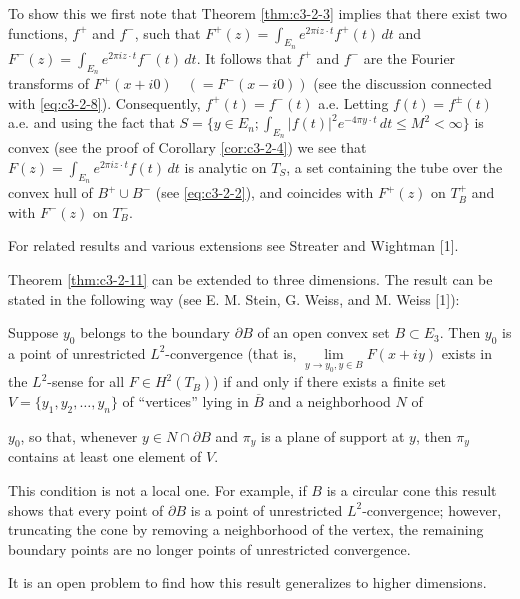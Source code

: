 To show this we first note that Theorem \ref{thm:c3-2-3} implies that there exist two functions, $f^+$ and $f^-$, such that $F^+(z) = \int_{E_n} e^{2\pi iz \cdot t} f^+(t) \, dt$ and $F^-(z) = \int_{E_n} e^{2\pi iz \cdot t} f^-(t) \, dt$. It follows that $f^+$ and $f^-$ are the Fourier transforms of $F^+(x + i0) \quad (= F^-(x - i0))$ (see the discussion connected with \eqref{eq:c3-2-8}). Consequently, $f^+(t) = f^-(t)$ a.e. Letting $f(t) = f^\pm(t)$ a.e. and using the fact that $S = \{y \in E_n; \int_{E_n} |f(t)|^2 e^{-4\pi y \cdot t} \, dt \leq M^2 < \infty\}$ is convex (see the proof of Corollary \ref{cor:c3-2-4}) we see that $F(z) = \int_{E_n} e^{2\pi iz \cdot t} f(t) \, dt$ is analytic on $T_S$, a set containing the tube over the convex hull of $B^+ \cup B^-$ (see \eqref{eq:c3-2-2}), and coincides with $F^+(z)$ on $T_B^+$ and with $F^-(z)$ on $T_B^-$.

For related results and various extensions see Streater and Wightman [1].

 Theorem \ref{thm:c3-2-11} can be extended to three dimensions. The result can be stated in the following way (see E. M. Stein, G. Weiss, and M. Weiss [1]):

Suppose $y_0$ belongs to the boundary $\partial B$ of an open convex set $B \subset E_3$. Then $y_0$ is a point of unrestricted $L^2$-convergence (that is, $\lim\limits_{y \to y_0, y \in B} F(x + iy)$ exists in the $L^2$-sense for all $F \in H^2(T_B)$) if and only if there exists a finite set $V = \{y_1, y_2, \ldots, y_n\}$ of ``vertices'' lying in $\overline{B}$ and a neighborhood $N$ of

$y_0$, so that, whenever $y \in N \cap \partial B$ and $\pi_y$ is a plane of support at $y$, then $\pi_y$ contains at least one element of $V$.

This condition is not a local one. For example, if $B$ is a circular cone this result shows that every point of $\partial B$ is a point of unrestricted $L^{2}$-convergence; however, truncating the cone by removing a neighborhood of the vertex, the remaining boundary points are no longer points of unrestricted convergence.

It is an open problem to find how this result generalizes to higher dimensions.

